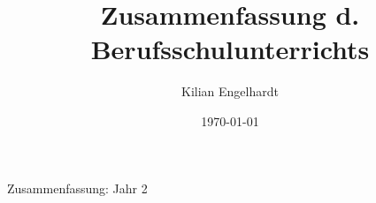 \documentclass[11pt,a4paper,oneside,ngerman]{article}
\author{Kilian Engelhardt}
\title{Zusammenfassung d. Berufsschulunterrichts}
\date{\today}
\begin{document}
	\begin{center}
		\Huge{Zusammenfassung: Jahr 2}
	\end{center}

%
\tableofcontents
\newpage
\pagestyle{fancy}
\setcounter{page}{1}



%
\end{document}
